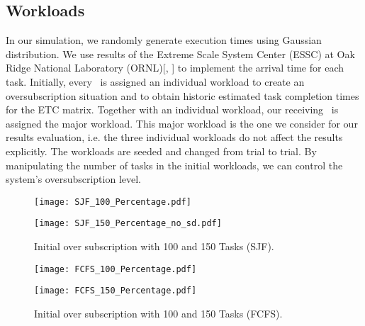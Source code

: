 \subsection{\textbf{Workloads}}
In our simulation, we randomly generate execution times using Gaussian distribution\cite{li2017resource}. We use results of the Extreme Scale System Center (ESSC) at Oak Ridge National Laboratory (ORNL)[\cite{khemka2015utility}, \cite{KHEMKA201514}] to implement the arrival time for each task. Initially, every \bs~is assigned an individual workload to create an oversubscription situation and to obtain historic estimated task completion times for the ETC matrix. Together with an individual workload, our receiving \bs~is assigned the major workload. This major workload is the one we consider for our results evaluation, i.e. the three individual workloads do not affect the results explicitly. The workloads are seeded and changed from trial to trial. By manipulating the number of tasks in the initial workloads, we can control the system's oversubscription level.
\begin{figure*}[h]
	\centering
	\begin{minipage}[b]{0.49\linewidth}
		\texttt{[image: SJF\_100\_Percentage.pdf]}
	\end{minipage}
	\hfill
	\begin{minipage}[b]{0.49\linewidth}
		\texttt{[image: SJF\_150\_Percentage\_no\_sd.pdf]}
	\end{minipage}
	\caption{Initial over subscription with 100 and 150 Tasks (SJF).}
\end{figure*}

\begin{figure*}[h]
	\centering
	\begin{minipage}[b]{0.49\linewidth}
		\texttt{[image: FCFS\_100\_Percentage.pdf]}
	\end{minipage}
	\hfill
	\begin{minipage}[b]{0.49\linewidth}
		\texttt{[image: FCFS\_150\_Percentage.pdf]}
	\end{minipage}
	\caption{Initial over subscription with 100 and 150 Tasks (FCFS).}
\end{figure*}     